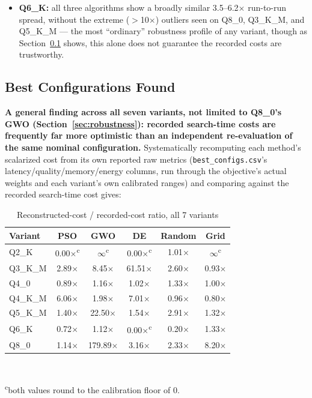 \documentclass[journal]{IEEEtran}
\begin{document}
\begin{itemize}
  \item \textbf{Q6\_K:} all three algorithms show a broadly similar 3.5--6.2$\times$ run-to-run spread, without the extreme ($>$10$\times$) outliers seen on Q8\_0, Q3\_K\_M, and Q5\_K\_M --- the most ``ordinary'' robustness profile of any variant, though as Section~\ref{sec:best-configs} shows, this alone does not guarantee the recorded costs are trustworthy.
\end{itemize}

\subsection{Best Configurations Found}
\label{sec:best-configs}

\textbf{A general finding across all seven variants, not limited to Q8\_0's GWO (Section~\ref{sec:robustness}): recorded search-time costs are frequently far more optimistic than an independent re-evaluation of the same nominal configuration.} Systematically recomputing each method's scalarized cost from its own reported raw metrics (\texttt{best\_configs.csv}'s latency/quality/memory/energy columns, run through the objective's actual weights and each variant's own calibrated ranges) and comparing against the recorded search-time cost gives:

\begin{table}[t]
\caption{Reconstructed-cost / recorded-cost ratio, all 7 variants}
\label{tab:reconciliation}
\centering
\footnotesize
\begin{tabular}{@{}lccccc@{}}
\toprule
Variant & PSO & GWO & DE & Random & Grid \\
\midrule
Q2\_K    & 0.00$\times$\textsuperscript{c} & $\infty$\textsuperscript{c} & 0.00$\times$\textsuperscript{c} & 1.01$\times$ & $\infty$\textsuperscript{c} \\
Q3\_K\_M & 2.89$\times$ & 8.45$\times$ & 61.51$\times$ & 2.60$\times$ & 0.93$\times$ \\
Q4\_0    & 0.89$\times$ & 1.16$\times$ & 1.02$\times$ & 1.33$\times$ & 1.00$\times$ \\
Q4\_K\_M & 6.06$\times$ & 1.98$\times$ & 7.01$\times$ & 0.96$\times$ & 0.80$\times$ \\
Q5\_K\_M & 1.40$\times$ & 22.50$\times$ & 1.54$\times$ & 2.91$\times$ & 1.32$\times$ \\
Q6\_K    & 0.72$\times$ & 1.12$\times$ & 0.00$\times$\textsuperscript{c} & 0.20$\times$ & 1.33$\times$ \\
Q8\_0    & 1.14$\times$ & 179.89$\times$ & 3.16$\times$ & 2.33$\times$ & 8.20$\times$ \\
\bottomrule
\end{tabular}
\\[2pt]
\raggedright\footnotesize\textsuperscript{c}both values round to the calibration floor of 0.
\end{table}
\end{document}
